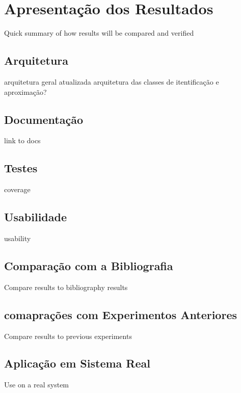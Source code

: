 \chapter{Apresentação dos Resultados}

Quick summary of how results will be compared and verified

\section{Arquitetura}
arquitetura geral atualizada
arquitetura das classes de itentificação e aproximação?

\section{Documentação}

link to docs

\section{Testes}

coverage

\section{Usabilidade}

usability

\section{Comparação com a Bibliografia}

Compare results to bibliography results

\section{comaprações com Experimentos Anteriores}

Compare results to previous experiments

\section{Aplicação em Sistema Real}

Use on a real system
